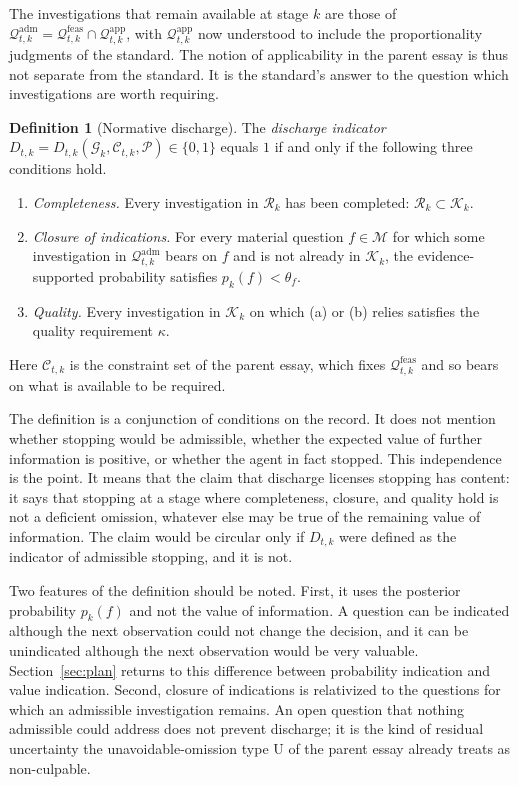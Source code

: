 \documentclass[11pt]{article}
\newcommand{\G}{\mathcal G}
\newcommand{\Q}{\mathcal Q}
\newcommand{\C}{\mathcal C}
\newcommand{\feas}{\mathrm{feas}}
\newcommand{\adm}{\mathrm{adm}}
\newcommand{\app}{\mathrm{app}}
\theoremstyle{plain}
\theoremstyle{definition}
\newtheorem{definition}{Definition}
\begin{document}
The investigations that remain available at stage $k$ are those of $\Q_{t,k}^{\adm}=\Q_{t,k}^{\feas}\cap\Q_{t,k}^{\app}$, with $\Q^{\app}_{t,k}$ now understood to include the proportionality judgments of the standard. The notion of applicability in the parent essay is thus not separate from the standard. It is the standard's answer to the question which investigations are worth requiring.

\begin{definition}[Normative discharge]\label{def:discharge}
The \emph{discharge indicator} $D_{t,k}=D_{t,k}(\G_k,\C_{t,k},\mathcal P)\in\{0,1\}$ equals $1$ if and only if the following three conditions hold.
\begin{enumerate}[label=(\alph*),nosep]
\item \emph{Completeness.} Every investigation in $\mathcal R_k$ has been completed: $\mathcal R_k\subset\mathcal K_k$.
\item \emph{Closure of indications.} For every material question $f\in\mathcal M$ for which some investigation in $\Q^{\adm}_{t,k}$ bears on $f$ and is not already in $\mathcal K_k$, the evidence-supported probability satisfies $p_k(f)<\theta_f$.
\item \emph{Quality.} Every investigation in $\mathcal K_k$ on which (a) or (b) relies satisfies the quality requirement $\kappa$.
\end{enumerate}
Here $\C_{t,k}$ is the constraint set of the parent essay, which fixes $\Q^{\feas}_{t,k}$ and so bears on what is available to be required.
\end{definition}

The definition is a conjunction of conditions on the record. It does not mention whether stopping would be admissible, whether the expected value of further information is positive, or whether the agent in fact stopped. This independence is the point. It means that the claim that discharge licenses stopping has content: it says that stopping at a stage where completeness, closure, and quality hold is not a deficient omission, whatever else may be true of the remaining value of information. The claim would be circular only if $D_{t,k}$ were defined as the indicator of admissible stopping, and it is not.

Two features of the definition should be noted. First, it uses the posterior probability $p_k(f)$ and not the value of information. A question can be indicated although the next observation could not change the decision, and it can be unindicated although the next observation would be very valuable. Section~\ref{sec:plan} returns to this difference between probability indication and value indication. Second, closure of indications is relativized to the questions for which an admissible investigation remains. An open question that nothing admissible could address does not prevent discharge; it is the kind of residual uncertainty the unavoidable-omission type U of the parent essay already treats as non-culpable.
\end{document}
